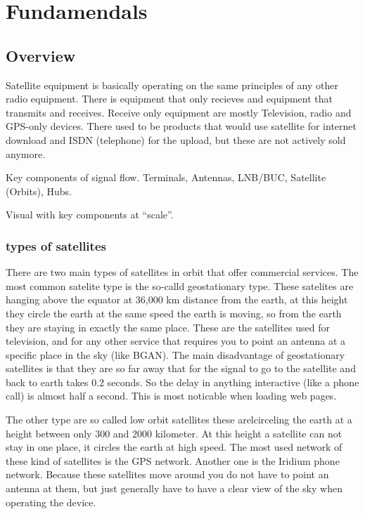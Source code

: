 \section{Fundamendals}
\label{fundamendals}

\subsection{Overview}
\label{overview}

Satellite equipment is basically operating on the same principles of any other radio equipment. There is equipment that only recieves and equipment that transmits and receives. Receive only equipment are mostly Television, radio and GPS-only devices. There used to be products that would use satellite for internet download and ISDN (telephone) for the upload, but these are not actively sold anymore.

Key components of signal flow. Terminals, Antennas, LNB\slash BUC, Satellite (Orbits), Hubs. 

Visual with key components at ``scale''.

\subsubsection{types of satellites}
\label{typesofsatellites}

There are two main types of satellites in orbit that offer commercial services. The most common satelite type is the so-calld geostationary type. These satelites are hanging above the equator at 36,000 km distance from the earth, at this height they circle the earth at the same speed the earth is moving, so from the earth they are staying in exactly the same place. These are the satellites used for television, and for any other service that requires you to point an antenna at a specific place in the sky (like BGAN). The main disadvantage of geostationary satellites is that they are so far away that for the signal to go to the satellite and back to earth takes 0.2 seconds. So the delay in anything interactive (like a phone call) is almost half a second. This is most noticable when loading web pages.

The other type are so called low orbit satellites these arelcirceling the earth at a height between only 300 and 2000 kilometer. At this height a satellite can not stay in one place, it circles the earth at high speed. The most used network of these kind of satellites is the GPS network. Another one is the Iridium phone network. Because these satellites move around you do not have to point an antenna at them, but just generally have to have a clear view of the sky when operating the device.

